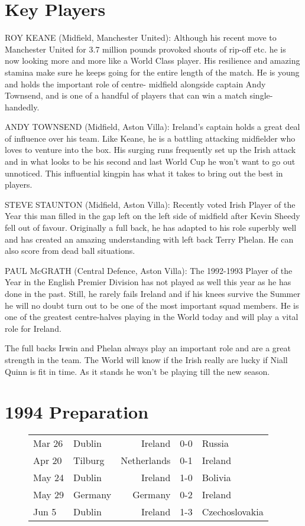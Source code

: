 \section{Key Players}
ROY KEANE (Midfield, Manchester United):
Although his recent move to Manchester United for 3.7 million pounds provoked 
shouts of rip-off etc. he is now looking more and more like a World Class 
player. His resilience and amazing stamina make sure he keeps going for the 
entire length of the match. He is young and holds the important role of centre-
midfield alongside captain Andy Townsend, and is one of a handful of players 
that can win a match single-handedly.

ANDY TOWNSEND (Midfield, Aston Villa):
Ireland's captain holds a great deal of influence over his team. Like Keane, he
is a battling attacking midfielder who loves to venture into the box. His
surging runs frequently set up the Irish attack and in what looks to be his 
second and last World Cup he won't want to go out unnoticed. This influential 
kingpin has what it takes to bring out the best in players.

STEVE STAUNTON (Midfield, Aston Villa):
Recently voted Irish Player of the Year this man filled in the gap left on the
left side of midfield after Kevin Sheedy fell out of favour. Originally a full
back, he has adapted to his role superbly well and has created an amazing 
understanding with left back Terry Phelan. He can also score from dead ball
situations.

PAUL McGRATH (Central Defence, Aston Villa):
The 1992-1993 Player of the Year in the English Premier Division has not played
as well this year as he has done in the past. Still, he rarely fails Ireland
and if his knees survive the Summer he will no doubt turn out to be one of the
most important squad members. He is one of the greatest centre-halves playing
in the World today and will play a vital role for Ireland.

The full backs Irwin and Phelan always play an important role and are a great 
strength in the team. The World will know if the Irish really are lucky if 
Niall Quinn is fit in time. As it stands he won't be playing till the new 
season.
\section{1994 Preparation}
\begin{figure}[H]
\begin{tabular}{l l r c l}
Mar 26 & Dublin & Ireland & 0-0 & Russia \\
Apr 20 & Tilburg & Netherlands & 0-1 & Ireland \\
May 24 & Dublin & Ireland & 1-0 & Bolivia \\
May 29 & Germany & Germany & 0-2 & Ireland \\
Jun 5 & Dublin & Ireland & 1-3 & Czechoslovakia \\
\end{tabular}
\end{figure}
